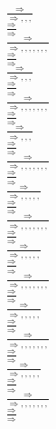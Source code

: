 \documentclass[11pt]{article}
\begin{document}
\begin{center}
\bigskip
\\$\frac{\Rightarrow }{\Rightarrow , , , }$
\bigskip
\\$\frac{\Rightarrow }{\Rightarrow }$
\bigskip
\\$\frac{\Rightarrow }{\Rightarrow , , , , , , , }$
\bigskip
\\$\frac{\Rightarrow }{\Rightarrow }$
\bigskip
\\$\frac{\Rightarrow }{\Rightarrow , , , }$
\bigskip
\\$\frac{\Rightarrow }{\Rightarrow }$
\bigskip
\\$\frac{\Rightarrow }{\Rightarrow , , , , , , , }$
\bigskip
\\$\frac{\Rightarrow }{\Rightarrow }$
\bigskip
\\$\frac{\Rightarrow }{\Rightarrow , , , }$
\bigskip
\\$\frac{\Rightarrow }{\Rightarrow }$
\bigskip
\\$\frac{\Rightarrow }{\Rightarrow , , , , , , , }$
\bigskip
\\$\frac{\Rightarrow }{\Rightarrow }$
\bigskip
\\$\frac{\Rightarrow }{\Rightarrow , , , , , }$
\bigskip
\\$\frac{\Rightarrow }{\Rightarrow }$
\bigskip
\\$\frac{\Rightarrow }{\Rightarrow , , , , , , , }$
\bigskip
\\$\frac{\Rightarrow }{\Rightarrow }$
\bigskip
\\$\frac{\Rightarrow }{\Rightarrow , , , , , }$
\bigskip
\\$\frac{\Rightarrow }{\Rightarrow }$
\bigskip
\\$\frac{\Rightarrow }{\Rightarrow , , , , , , , }$
\bigskip
\\$\frac{\Rightarrow }{\Rightarrow }$
\bigskip
\\$\frac{\Rightarrow }{\Rightarrow , , , , , }$
\bigskip
\\$\frac{\Rightarrow }{\Rightarrow }$
\bigskip
\\$\frac{\Rightarrow }{\Rightarrow , , , , , , , }$
\bigskip
\\$\frac{\Rightarrow }{\Rightarrow }$
\bigskip
\\$\frac{\Rightarrow }{\Rightarrow , , , , , }$
\bigskip
\\$\frac{\Rightarrow }{\Rightarrow }$
\bigskip
\\$\frac{\Rightarrow }{\Rightarrow , , , , , , , }$
\bigskip
\\$\frac{\Rightarrow }{\Rightarrow }$
\bigskip

\end{center}
\end{document}
